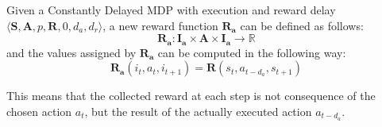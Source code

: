                 \begin{definition}
                    \label{def:execaugmentreward}
                    Given a Constantly Delayed MDP with execution and reward delay $ \langle \mathbf{S}, \mathbf{A}, p, \mathbf{R}, 0, d_a, d_r \rangle$,
                    a new reward function $\mathbf{R_{a}}$ can be defined as follows:
                    \[ \mathbf{R_{a}}: \mathbf{I_{a}} \times \mathbf{A} \times \mathbf{I_{a}} \rightarrow \mathds{R}\]
                    and the values assigned by $\mathbf{R_{a}}$ can be computed in the following way:
                    \[ \mathbf{R_{a}}\left( i_t, a_{t}, i_{t+1} \right) = \mathbf{R} \left( s_t, a_{t-d_{a}}, s_{t+1} \right)\]
                \end{definition}
                \noindent
                This means that the collected reward at each step is not consequence of the chosen action $a_t$, but the result of the actually executed action $a_{t-d_{a}}$.
                

